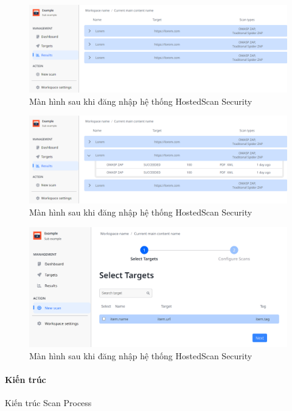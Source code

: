 \begin{figure}[H]
    \centering
    \includegraphics[width=\textwidth]{images/prototype/prototype_25102022/dashboard_result.png}
    \caption{Màn hình sau khi đăng nhập hệ thống HostedScan Security}
\end{figure}

\begin{figure}[H]
    \centering
    \includegraphics[width=\textwidth]{images/prototype/prototype_25102022/dashboard_result_opening-sub.png}
    \caption{Màn hình sau khi đăng nhập hệ thống HostedScan Security}
\end{figure}

\begin{figure}[H]
    \centering
    \includegraphics[width=\textwidth]{images/prototype/prototype_22112022/dashboad_new scan_select target.png}
    \caption{Màn hình sau khi đăng nhập hệ thống HostedScan Security}
\end{figure}

\paragraph{Kiến trúc}
\tab Kiến trúc Scan Process
\vspace{3cm}

